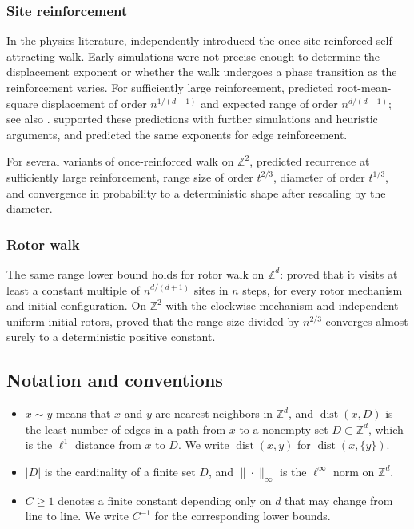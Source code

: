 \documentclass[11pt]{amsart}
\theoremstyle{plain}
\theoremstyle{definition}
\newcommand{\Z}{\mathbb Z}
\newcommand{\dist}{\operatorname{dist}}
\begin{document}
	\subsubsection{Site reinforcement}
	In the physics literature, \citet{Sapozhnikov1994} independently
	introduced the once-site-reinforced self-attracting walk.
	Early simulations were not precise enough to determine the displacement
	exponent or whether the walk undergoes a phase transition as the
	reinforcement varies. For sufficiently large reinforcement,
	\citet*{OrdemannBerkolaikoHavlinBunde2000} predicted root-mean-square
	displacement of order $n^{1/(d+1)}$ and expected range of order
	$n^{d/(d+1)}$; see also \citet*{OrdemannTomerBerkolaikoHavlinBunde2001}.
	\citet*{FosterGrassbergerPaczuski2009} supported these predictions with
	further simulations and heuristic arguments, and predicted the same
	exponents for edge reinforcement.

	For several variants of once-reinforced walk  on $\Z^2$,
	\citet[Conjecture~7]{Beffara2011} predicted recurrence at sufficiently
	large reinforcement, range size of order $t^{2/3}$, diameter of order
	$t^{1/3}$, and convergence in probability to a deterministic shape
	after rescaling by the diameter. 

	\subsubsection{Rotor walk}
	The same range lower bound holds for rotor walk on $\Z^d$:
	\citet[Theorem~1.1]{FlorescuLevinePeres2016} proved that it visits at least
	a constant multiple of $n^{d/(d+1)}$ sites in $n$ steps, for every rotor
	mechanism and initial configuration. On $\Z^2$ with the clockwise
	mechanism and independent uniform initial rotors,
	\citet[Theorem~1.1]{BouRabeePeres2026} proved that the range size divided
	by $n^{2/3}$ converges almost surely to a deterministic positive constant.


	\subsection{Notation and conventions}

	\begin{itemize}
		\item $x\sim y$ means that $x$ and $y$ are nearest neighbors in $\Z^d$, and
		$\dist(x,D)$ is the least number of edges in a path from $x$ to a nonempty set
		$D\subset\Z^d$, which is the $\ell^1$ distance from $x$ to $D$.
		We write $\dist(x,y)$ for $\dist(x,\{y\})$.
		\item $|D|$ is the cardinality of a finite set $D$, and $\|\cdot\|_\infty$ is
		the $\ell^\infty$ norm on $\Z^d$.
		\item $C\geq1$ denotes a finite constant depending only on $d$ that may
		change from line to line. We write $C^{-1}$ for the corresponding lower bounds.
	\end{itemize}
\end{document}
